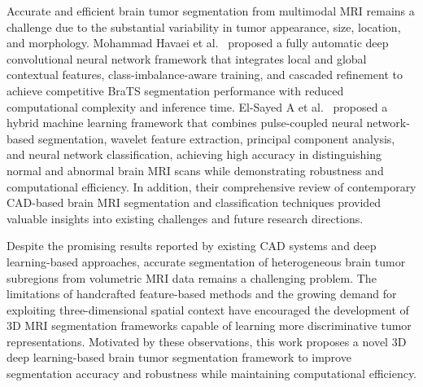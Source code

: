 {\sloppy Accurate and efficient brain tumor segmentation from multimodal MRI remains a challenge due to the substantial variability in tumor appearance, size, location, and morphology. Mohammad Havaei et al.~\cite{havaei2017brain} proposed a fully automatic deep convolutional neural network framework that integrates local and global contextual features, class-imbalance-aware training, and cascaded refinement to achieve competitive BraTS segmentation performance with reduced computational complexity and inference time. El-Sayed A et al.~\cite{el2014computer} proposed a hybrid machine learning framework that combines pulse-coupled neural network-based segmentation, wavelet feature extraction, principal component analysis, and neural network classification, achieving high accuracy in distinguishing normal and abnormal brain MRI scans while demonstrating robustness and computational efficiency. In addition, their comprehensive review of contemporary CAD-based brain MRI segmentation and classification techniques \cite{maitra2008hybrid, el2010hybrid, cheng2010automated, cherkassky2007learning} provided valuable insights into existing challenges and future research directions.\par}

Despite the promising results reported by existing CAD systems and deep learning-based approaches, accurate segmentation of heterogeneous brain tumor subregions from volumetric MRI data remains a challenging problem. The limitations of handcrafted feature-based methods and the growing demand for exploiting three-dimensional spatial context have encouraged the development of 3D MRI segmentation frameworks capable of learning more discriminative tumor representations. Motivated by these observations, this work proposes a novel 3D deep learning-based brain tumor segmentation framework to improve segmentation accuracy and robustness while maintaining computational efficiency.

\vspace*{-1\baselineskip}
